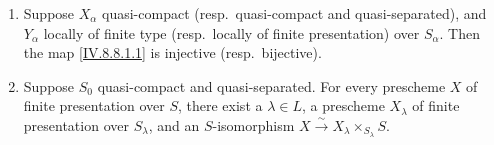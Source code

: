 \begin{theorem}[8.8.2]
\label{IV.8.8.2}
\begin{enumerate}[label=(\roman*)]
\item Suppose $X_\alpha$ quasi-compact (resp.\ quasi-compact and quasi-separated), and $Y_\alpha$ locally of finite type (resp.\ locally of finite presentation) over $S_\alpha$.
Then the map \eqref{IV.8.8.1.1} is injective (resp.\ bijective).
\item Suppose $S_0$ quasi-compact and quasi-separated.
For every prescheme $X$ of finite presentation over $S$, there exist a $\lambda\in L$, a prescheme $X_\lambda$ of finite presentation over $S_\lambda$, and an $S$-isomorphism $X\xrightarrow{\sim}X_\lambda\times_{S_\lambda}S$.
\end{enumerate}
\end{theorem}

